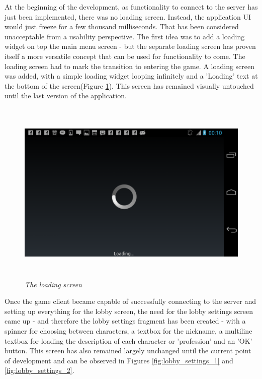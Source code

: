 At the beginning of the development, as functionality to connect to the server
has just been implemented, there was no loading screen. Instead, the application
UI would just freeze for a few thousand milliseconds. That has been considered
unacceptable from a usability perspective. The first idea was to add a loading
widget on top the main menu screen - but the separate loading screen has proven
itself a more versatile concept that can be used for functionality to come. The
loading screen had to mark the transition to entering the game. A loading screen
was added, with a simple loading widget looping infinitely and a 'Loading' text
at the bottom of the screen(Figure \ref{fig:loading}). This screen has remained
visually untouched until the last version of the application.\newline

\begin{figure}
\includegraphics[height=3.5in,width=6.23in]{./images/android_screenshots/tutorial_loading.png}
\caption{\small \sl The loading screen\label{fig:loading}}
\end{figure}

Once the game client became capable of successfully connecting to the server and
setting up everything for the lobby screen, the need for the lobby settings
screen came up - and therefore the lobby settings fragment has been created -
with a spinner for choosing between characters, a textbox for the nickname, a
multiline textbox for loading the description of each character or 'profession'
and an 'OK' button. This screen has also remained largely unchanged until the
current point of development and can be observed in Figures
\ref{fig:lobby_settings_1} and \ref{fig:lobby_settings_2}.

